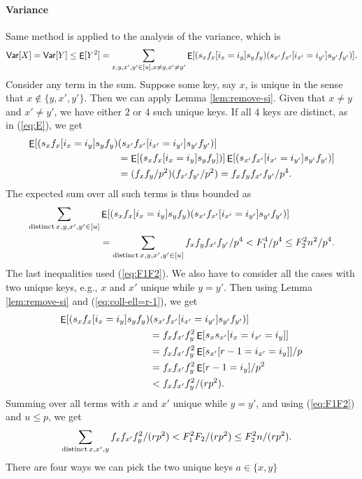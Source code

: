 \documentclass[12pt]{article}
\DeclareMathOperator*{\E}{\sf{E}}
\newcommand{\Var}{{\sf Var}}
\newcommand{\req}[1]{(\ref{#1})}
\begin{document}
\paragraph{Variance}
Same method is applied to the analysis of the variance, which is
\[\Var[X]=\Var[Y]\leq \E[Y^2]=
\sum_{x,y,x',y'\in[u],x\neq y,x'\neq y'}\E[(s_x f_x[i_x=i_y]s_y f_y)
  (s_{x'}f_{x'}[i_{x'}=i_{y'}]s_{y'} f_{y'})].\] 
Consider any term in the
sum. Suppose some key, say $x$, is unique in the sense that
$x\not\in\{y,x',y'\}$. Then we can apply Lemma \ref{lem:remove-si}.
Given that $x\neq y$
and $x'\neq y'$, we have either $2$ or $4$ such unique keys. If all
4 keys are distinct, as in \req{eq:E}, we get
\begin{align*}
\E[(s_x f_x[i_x=i_y]s_y f_y)&
(s_{x'}f_{x'}[i_{x'}=i_{y'}]s_{y'} f_{y'})]\\
&=\E[(s_x f_x[i_x=i_y]s_y f_y])]\E[(s_{x'}f_{x'}[i_{x'}=i_{y'}]s_{y'} f_{y'})]\\
&=(f_x f_y/p^2)(f_{x'} f_{y'}/p^2)=f_x f_yf_{x'} f_{y'}/p^4.
\end{align*}
The expected sum over all such terms is thus bounded
as 
\begin{align}
\sum_{{\rm distinct}\, x,y,x',y'\in[u]}&
\E[(s_x f_x[i_x=i_y]s_y f_y)
(s_{x'}f_{x'}[i_{x'}=i_{y'}]s_{y'} f_{y'})]\nonumber\\
&=\sum_{{\rm distinct}\,x,y,x',y'\in[u]}
f_xf_yf_{x'}f_{y'}/p^4<F_1^4/p^4\leq F_2^2 n^2/p^4.\label{eq:distinct}
\end{align}
The last inequalities 
used \req{eq:F1F2}. We also have to consider all the cases with two unique keys, e.g., $x$ 
and $x'$ unique while $y=y'$. Then using Lemma \ref{lem:remove-si} and \req{eq:coll-ell=r-1}, we get
\begin{align*}
\E[(s_x f_x[i_x=i_y]s_y f_y)&(s_{x'}f_{x'}[i_{x'}=i_{y'}]s_{y'} f_{y'})]\\
&=f_xf_{x'}f_y^2\E[s_xs_{x'} [i_x=i_{x'}=i_y]]\\
&=f_xf_{x'}f_y^2\E[s_{x'} [r-1=i_{x'}=i_y]]/p\\
&=f_xf_{x'}f_y^2\E[r-1=i_y]/p^2\\
    &<f_xf_{x'}f_y^2/(rp^2).
\end{align*}    
Summing over all terms with $x$ and $x'$ unique while $y=y'$, and
using \req{eq:F1F2} and $u\leq p$, we get 
\begin{align*}
  \sum_{{\rm distinct}\,x,x',y} f_xf_{x'}f_y^2 /(rp^2)&<
    F_1^2F_2/(rp^2)\leq F_2^2 n/(rp^2).
\end{align*}
There are four ways we can pick the two unique keys $a\in \{x,y\}$
\end{document}
